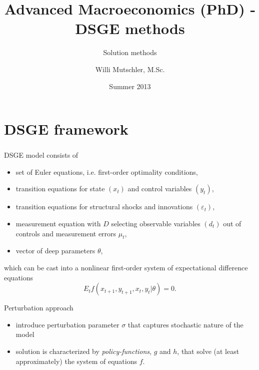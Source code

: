 \documentclass[handout]{beamer}  %
\begin{document}
\author[Willi Mutschler]{Willi Mutschler, M.Sc.}
\date{Summer 2013}
\title[DSGE methods]{Advanced Macroeconomics (PhD) - DSGE methods}
\subtitle{Solution methods}

\begin{frame}
\titlepage
\end{frame}

\section{DSGE framework}

\begin{frame}
\frametitle{\secname}\footnotesize
DSGE model consists of
\begin{itemize}[<+->]
     \item set of Euler equations, i.e. first-order optimality conditions,
     \item transition equations for state $(x_t)$ and control variables $(y_t)$,
     \item transition equations for structural shocks and innovations $(\varepsilon_t)$,
     \item measurement equation with $D$ selecting observable variables $(d_t)$  out of controls and measurement errors $\mu_t$,
     \item vector of deep parameters $\theta$,
\end{itemize}\pause
which can be cast into a nonlinear first-order system of expectational difference equations $$E_t f \left( x_{t+1},y_{t+1},x_t,y_t|\theta \right)= 0.$$
\begin{block}{Perturbation approach}
\begin{itemize}
  \item introduce perturbation parameter $\sigma$ that captures stochastic nature of the model
  \item solution is characterized by \emph{policy-functions}, $g$ and $h$, that solve (at least approximately) the system of equations $f$.
\end{itemize}
\end{block}
\end{frame}
\end{document}
